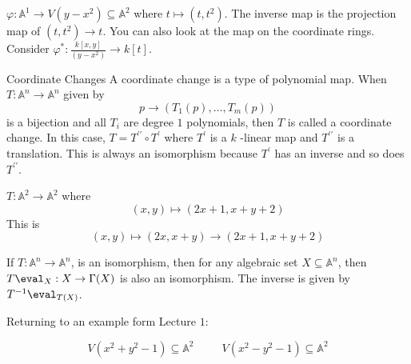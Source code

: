 \documentclass{report}
\begin{document}
\begin{examples}
    \begin{example}
        $\varphi : \mathbb{A}^{1} \rightarrow V(y - x^{2}) \subseteq \mathbb{A}^{2}$ where $t \mapsto (t, t^{2})$. The inverse map is the projection map of $(t, t^{2}) \rightarrow t$. You can also look at the map on the coordinate rings. Consider $\varphi^{*} : \frac{k[x, y]}{(y - x^{2})} \rightarrow k[t]$.
    \end{example}
\end{examples}

\begin{definition}{Coordinate Changes}
    A coordinate change is a type of polynomial map. When $T : \mathbb{A}^{n} \rightarrow \mathbb{A}^{n}$ given by
        \begin{equation*}
            p \rightarrow (T_{1}(p), \ldots , T_{m}(p))
        \end{equation*}
    is a bijection and all $T_{i}$ are degree $1$ polynomials, then $T$ is called a coordinate change. In this case, $T = T^{\prime\prime} \circ T^{\prime}$ where $T^{\prime}$ is a $k$ -linear map and $T^{\prime\prime}$ is a translation. This is always an isomorphism because $T^{\prime}$ has an inverse and so does $T^{\prime\prime}$.
\end{definition} 

\begin{examples}
    \begin{example}
        $T : \mathbb{A}^{2} \rightarrow \mathbb{A}^{2}$ where
            \begin{equation*}
                (x, y) \mapsto (2x + 1, x + y + 2)
            \end{equation*}
        This is 
            \begin{equation*}
                (x, y) \mapsto (2x, x + y) \rightarrow (2x + 1, x + y + 2)
            \end{equation*}
    \end{example}
\end{examples}

If $T : \mathbb{A}^{n} \rightarrow \mathbb{A}^{n}$, is an isomorphism, then for any algebraic set $X \subseteq \mathbb{A}^{n}$, then $T \eval_{X} : X \rightarrow \Gamma(X)$ is also an isomorphism. The inverse is given by $T^{-1}\eval_{T(X)}$.

Returning to an example form Lecture $1$: 

\begin{equation*}
    V(x^{2} + y^{2} - 1) \subseteq \mathbb{A}^{2} \hspace{30pt} V(x^{2} - y^{2} - 1) \subseteq \mathbb{A}^{2}
\end{equation*}
\end{document}
